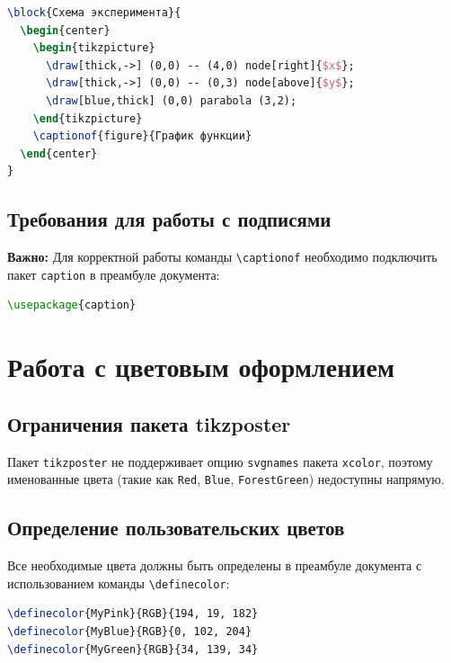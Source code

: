 \documentclass[12pt,a4paper]{article}
\begin{document}
\begin{lstlisting}[language=TeX]
\block{Схема эксперимента}{
  \begin{center}
    \begin{tikzpicture}
      \draw[thick,->] (0,0) -- (4,0) node[right]{$x$};
      \draw[thick,->] (0,0) -- (0,3) node[above]{$y$};
      \draw[blue,thick] (0,0) parabola (3,2);
    \end{tikzpicture}
    \captionof{figure}{График функции}
  \end{center}
}
\end{lstlisting}

\subsection{Требования для работы с подписями}

\textbf{Важно:} Для корректной работы команды \texttt{\textbackslash captionof} необходимо подключить пакет \texttt{caption} в преамбуле документа:

\begin{lstlisting}[language=TeX]
\usepackage{caption}
\end{lstlisting}

\section{Работа с цветовым оформлением}

\subsection{Ограничения пакета tikzposter}

Пакет \texttt{tikzposter} не поддерживает опцию \texttt{svgnames} пакета \texttt{xcolor}, поэтому именованные цвета (такие как \texttt{Red}, \texttt{Blue}, \texttt{ForestGreen}) недоступны напрямую.

\subsection{Определение пользовательских цветов}

Все необходимые цвета должны быть определены в преамбуле документа с использованием команды \texttt{\textbackslash definecolor}:

\begin{lstlisting}[language=TeX]
\definecolor{MyPink}{RGB}{194, 19, 182}
\definecolor{MyBlue}{RGB}{0, 102, 204}
\definecolor{MyGreen}{RGB}{34, 139, 34}
\end{lstlisting}
\end{document}
